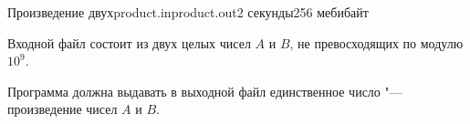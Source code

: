 \begin{problem}{Произведение двух}{product.in}{product.out}{2 секунды}{256 мебибайт}{}

\InputFile

Входной файл состоит из двух целых чисел $A$ и $B$, не превосходящих
по модулю $10^9$.

\OutputFile

Программа должна выдавать в выходной файл единственное число "--- 
произведение чисел $A$ и $B$.

\Example

\begin{example}
%
\end{example}

\end{problem}
